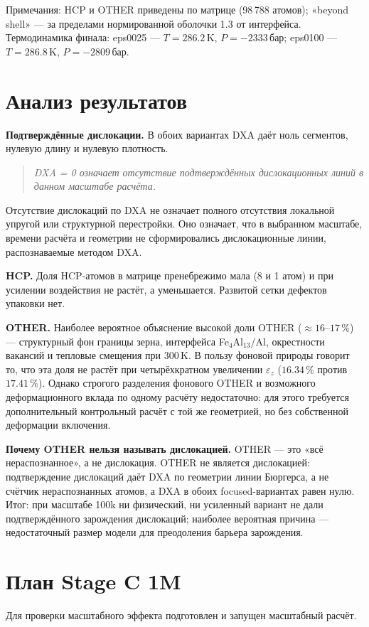 \documentclass[14pt,a4paper]{extarticle}
\begin{document}
Примечания: HCP и OTHER приведены по матрице (98\,788 атомов); «beyond shell» — за пределами нормированной оболочки 1.3 от интерфейса. Термодинамика финала: eps0025 — $T = 286.2$\,K, $P = -2333$\,бар; eps0100 — $T = 286.8$\,K, $P = -2809$\,бар.

\section{Анализ результатов}
\textbf{Подтверждённые дислокации.} В обоих вариантах DXA даёт ноль сегментов, нулевую длину и нулевую плотность.

\begin{quote}
\itshape DXA = 0 означает отсутствие подтверждённых дислокационных линий в данном масштабе расчёта.
\end{quote}

Отсутствие дислокаций по DXA не означает полного отсутствия локальной упругой или структурной перестройки. Оно означает, что в выбранном масштабе, времени расчёта и геометрии не сформировались дислокационные линии, распознаваемые методом DXA.

\textbf{HCP.} Доля HCP-атомов в матрице пренебрежимо мала (8 и 1 атом) и при усилении воздействия не растёт, а уменьшается. Развитой сетки дефектов упаковки нет.

\textbf{OTHER.} Наиболее вероятное объяснение высокой доли OTHER ($\approx 16$–$17\,\%$) — структурный фон границы зерна, интерфейса Fe$_4$Al$_{13}$/Al, окрестности вакансий и тепловые смещения при 300\,K. В пользу фоновой природы говорит то, что эта доля не растёт при четырёхкратном увеличении $\varepsilon_z$ ($16.34\,\%$ против $17.41\,\%$). Однако строгого разделения фонового OTHER и возможного деформационного вклада по одному расчёту недостаточно: для этого требуется дополнительный контрольный расчёт с той же геометрией, но без собственной деформации включения.

\textbf{Почему OTHER нельзя называть дислокацией.} OTHER — это «всё нераспознанное», а не дислокация. OTHER не является дислокацией: подтверждение дислокаций даёт DXA по геометрии линии Бюргерса, а не счётчик нераспознанных атомов, а DXA в обоих focused-вариантах равен нулю. Итог: при масштабе 100k ни физический, ни усиленный вариант не дали подтверждённого зарождения дислокаций; наиболее вероятная причина — недостаточный размер модели для преодоления барьера зарождения.

\section{План Stage C 1M}
Для проверки масштабного эффекта подготовлен и запущен масштабный расчёт.
\end{document}
